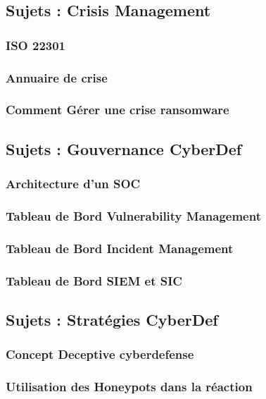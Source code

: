 \subsection{Sujets : Crisis Management}
\subsubsection{ISO 22301}
\subsubsection{Annuaire de crise}
\subsubsection{Comment Gérer une crise ransomware }


\subsection{Sujets : Gouvernance CyberDef}
\subsubsection{Architecture d'un SOC}
\subsubsection{Tableau de Bord Vulnerability Management}
\subsubsection{Tableau de Bord Incident Management}
\subsubsection{Tableau de Bord SIEM et SIC}


\subsection{Sujets : Stratégies CyberDef}
\subsubsection{Concept Deceptive cyberdefense}
\subsubsection{Utilisation des Honeypots dans la réaction }
